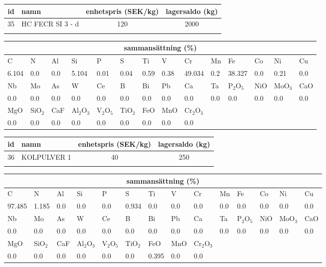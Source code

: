 \begin{center}
{\scriptsize\addtolength{\tabcolsep}{-3pt}
\begin{tabular}{clcc}
id&namn&enhetspris (SEK/kg)&lagersaldo (kg)\\
\hline
35&HC FECR SI 3 - d&120&2000\\\\
\end{tabular}
\begin{tabular}{llllllllllllll}
\multicolumn{14}{c}{sammansättning (\%)}\\
\hline
C&N&Al&Si&P&S&Ti&V&Cr&Mn&Fe&Co&Ni&Cu\\
\hline
6.104&0.0&0.0&5.104& 0.01&0.04&0.59&0.38& 49.034&0.2&38.327&0.0& 0.21&0.0\\
\hline
Nb&Mo&As&W&Ce&B&Bi&Pb&Ca&Ta&P$_2$O$_5$&NiO&MoO$_3$&CaO\\
\hline
0.0& 0.0& 0.0& 0.0& 0.0& 0.0& 0.0& 0.0& 0.0& 0.0& 0.0& 0.0& 0.0& 0.0\\
\hline
MgO&SiO$_2$&CaF&Al$_2$O$_3$&V$_2$O$_5$&TiO$_2$&FeO&MnO&Cr$_2$O$_3$\\
\hline
0.0& 0.0& 0.0& 0.0& 0.0& 0.0& 0.0& 0.0& 0.0\\
\end{tabular}
}
\end{center}

\begin{center}
{\scriptsize\addtolength{\tabcolsep}{-3pt}
\begin{tabular}{clcc}
id&namn&enhetspris (SEK/kg)&lagersaldo (kg)\\
\hline
36&KOLPULVER 1&40&250\\\\
\end{tabular}
\begin{tabular}{llllllllllllll}
\multicolumn{14}{c}{sammansättning (\%)}\\
\hline
C&N&Al&Si&P&S&Ti&V&Cr&Mn&Fe&Co&Ni&Cu\\
\hline
97.485&1.185&0.0&0.0& 0.0&0.934&0.0&0.0& 0.0&0.0&0.0&0.0& 0.0&0.0\\
\hline
Nb&Mo&As&W&Ce&B&Bi&Pb&Ca&Ta&P$_2$O$_5$&NiO&MoO$_3$&CaO\\
\hline
0.0& 0.0& 0.0& 0.0& 0.0& 0.0& 0.0& 0.0& 0.0& 0.0& 0.0& 0.0& 0.0& 0.0\\
\hline
MgO&SiO$_2$&CaF&Al$_2$O$_3$&V$_2$O$_5$&TiO$_2$&FeO&MnO&Cr$_2$O$_3$\\
\hline
0.0& 0.0& 0.0& 0.0& 0.0& 0.0& 0.395& 0.0& 0.0\\
\end{tabular}
}
\end{center}

